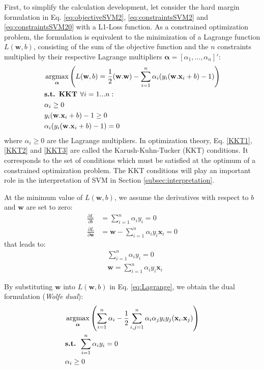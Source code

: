 First, to simplify the calculation development, let consider the hard margin formulation in Eq. \ref{eq:objectiveSVM2}, \ref{eq:constraintsSVM2} and \ref{eq:constraintsSVM20} with a L1-Loss function. As a constrained optimization problem, the formulation is equivalent to the minimization of a Lagrange function $L(\textbf{w},b)$, consisting of the sum of the objective function and the $n$ constraints multiplied by their respective Lagrange multipliers $\boldsymbol{\alpha} = [\alpha_1, \ldots, \alpha_n]'$: 
\begin{align}
	& \argmax_{\boldsymbol{\alpha}} \left( L(\textbf{w},b) = \frac{1}{2}(\textbf{w}.\textbf{w})-\sum\limits_{i=1}^{n}\alpha_i(y_i(\textbf{w}.\textbf{x}_i+b)-1) \right) \label{eq:Lagrange} \\
	& \textbf{s.t. KKT } \forall i = 1...n: \nonumber \\
	& \alpha_i \geq 0 \label{KKT1}\\
	& y_i(\textbf{w}.\textbf{x}_i+b)-1 \geq 0 \label{KKT2}\\
	& \alpha_i (y_i(\textbf{w}.\textbf{x}_i+b)-1) = 0 \label{KKT3}
\end{align}
\noindent where $\alpha_i \geq 0$ are the Lagrange multipliers. In optimization theory, Eq. \ref{KKT1}, \ref{KKT2} and \ref{KKT3} are called the Karush-Kuhn-Tucker (KKT) conditions. It corresponds to the set of conditions which must be satisfied at the optimum of a constrained optimization problem. The KKT conditions will play an important role in the interpretation of SVM in Section \ref{subsec:interpretation}. 

\noindent At the minimum value of $L(\textbf{w},b)$, we assume the derivatives with respect to $b$ and $\textbf{w}$ are set to zero:
\begin{align*}
\frac{\partial L}{\partial b} &= \sum\limits_{i=1}^{n}\alpha_i y_i = 0 \\
\frac{\partial L}{\partial \textbf{w}} &= \textbf{w}-\sum\limits_{i=1}^{n}\alpha_i y_i \textbf{x}_i = 0
\end{align*}
\noindent that leads to:
\begin{align}
&\sum\limits_{i=1}^{n}\alpha_i y_i = 0 \\
& \textbf{w} = \sum\limits_{i=1}^{n}\alpha_i y_i \textbf{x}_i
\end{align}

\noindent By substituting $\textbf{w}$ into $L(\textbf{w},b)$ in Eq. \ref{eq:Lagrange}, we obtain the dual formulation (\textit{Wolfe dual}):
\begin{align}
	& \argmax_{\boldsymbol{\alpha}} \left( 
	\sum\limits_{i=1}^{n} \alpha_i - \frac{1}{2} \sum\limits_{i,j=1}^{n} \alpha_i \alpha_j y_i y_j (\textbf{x}_i . \textbf{x}_j) 
	\right) 
	\label{eq:dualSVM}\\
	& \textbf{s.t. } \sum\limits_{i=1}^{n}\alpha_i y_i = 0 \label{constraintdual1}\\
	& \alpha_i \geq 0 \label{constraintdual2}
\end{align}

